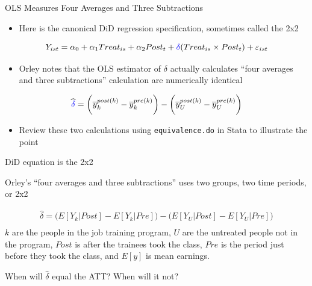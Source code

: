 \documentclass{beamer}
\begin{document}
\begin{frame}{OLS Measures Four Averages and Three Subtractions}
\begin{itemize}
\item Here is the canonical DiD regression specification, sometimes called the 2x2
\end{itemize}

$$Y_{ist} = \alpha_0 + \alpha_1 Treat_{is} + \alpha_2 Post_{t} + \textcolor{blue}{\delta} (Treat_{is} \times Post_t) + \varepsilon_{ist} $$

\bigskip

\begin{itemize}
\item Orley notes that the OLS estimator of $\delta$ actually calculates ``four averages and three subtractions'' calculation are numerically identical 
\end{itemize}

\bigskip

$$\widehat{\textcolor{blue}{\delta}} = \bigg ( \overline{y}_k^{post(k)} - \overline{y}_k^{pre(k)} \bigg ) - \bigg ( \overline{y}_U^{post(k)} - \overline{y}_U^{pre(k)} \bigg ) $$

\begin{itemize}
\item Review these two calculations using \texttt{equivalence.do} in Stata to illustrate the point
\end{itemize}


\end{frame}

\begin{frame}{DiD equation is the 2x2}

Orley's ``four averages and three subtractions'' uses two groups, two time periods, or 2x2

\begin{eqnarray*}
\widehat{\delta} = \bigg ( E[Y_k|Post] - E[Y_k|Pre] \bigg ) - \bigg ( E[Y_U | Post ] - E[ Y_U | Pre] \bigg) \\
\end{eqnarray*}$k$ are the people in the job training program, $U$ are the untreated people not in the program, $Post$ is after the trainees took the class, $Pre$ is the period just before they took the class, and $E[y]$ is mean earnings. 

\bigskip

When will $\widehat{\delta}$ equal the ATT?  When will it not?

\end{frame}
\end{document}
